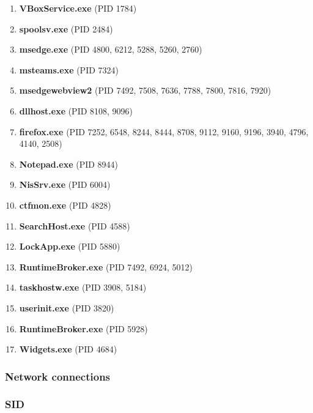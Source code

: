 \documentclass[12pt]{article}
\begin{document}
\begin{enumerate}
\item \textbf{VBoxService.exe} (PID 1784)

\item \textbf{spoolsv.exe} (PID 2484)

\item \textbf{msedge.exe} (PID 4800, 6212, 5288, 5260, 2760)

\item \textbf{msteams.exe} (PID 7324)

\item \textbf{msedgewebview2} (PID 7492, 7508, 7636, 7788, 7800, 7816, 7920)

\item \textbf{dllhost.exe} (PID 8108, 9096)

\item \textbf{firefox.exe} (PID 7252, 6548, 8244, 8444, 8708, 9112, 9160, 9196, 3940, 4796, 4140, 2508)

\item \textbf{Notepad.exe} (PID 8944)

\item \textbf{NisSrv.exe} (PID 6004)

\item \textbf{ctfmon.exe} (PID 4828)

\item \textbf{SearchHost.exe} (PID 4588)

\item \textbf{LockApp.exe} (PID 5880)

\item \textbf{RuntimeBroker.exe} (PID 7492, 6924, 5012)

\item \textbf{taskhostw.exe} (PID 3908, 5184)

\item \textbf{userinit.exe} (PID 3820)

\item \textbf{RuntimeBroker.exe} (PID 5928)

\item \textbf{Widgets.exe} (PID 4684)
        
\end{enumerate}

\subsubsection{Network connections}

\subsubsection{SID}
\end{document}
